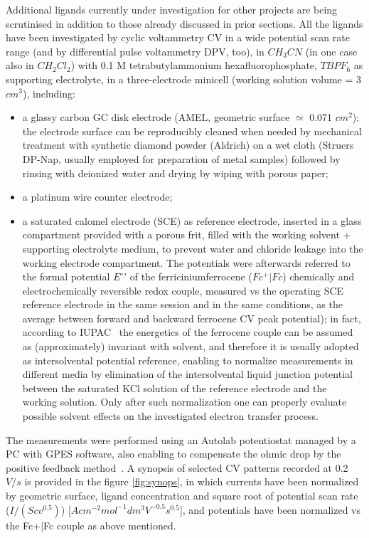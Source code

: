 \documentclass[../Master.tex]{subfiles}
\begin{document}
Additional ligands currently under investigation for other projects are being scrutinised in addition to those already discussed in prior sections.
All the ligands have been investigated by cyclic voltammetry CV in a wide potential scan rate range (and by differential pulse voltammetry DPV, too), in \(CH_{3}CN\) (in one case also in \(CH_{2}Cl_{2}\)) with 0.1 M tetrabutylammonium hexafluorophosphate, \(TBPF_{6}\) as supporting electrolyte, in a three-electrode minicell (working solution volume = 3 \(cm^{3}\)), including:

\begin{itemize}
	\item a glassy carbon GC disk electrode (AMEL, geometric surface \(\simeq\) 0.071 \(cm^{2}\)); the electrode surface can be reproducibly cleaned when needed by mechanical treatment with synthetic diamond powder (Aldrich) on a wet cloth (Struers DP-Nap, usually employed for preparation of metal samples) followed by rinsing with deionized water and drying by wiping with porous paper;
	\item a platinum wire counter electrode;
	\item a saturated calomel electrode (SCE) as reference electrode, inserted in a glass compartment provided with a porous frit, filled with the working solvent + supporting electrolyte medium, to prevent water and chloride leakage into the working electrode compartment. The potentials were afterwards referred to the formal potential \(E ^{\circ}’\) of the ferricinium\vert ferrocene (\(Fc^{+}|Fc\)) chemically and electrochemically reversible redox couple, measured  vs the operating SCE reference electrode in the same session and in the same conditions, as the average between forward and backward ferrocene CV peak potential); in fact, according to IUPAC\ \cite{gritzner_recommendations_1982} the energetics of the ferrocene couple can be assumed as (approximately) invariant with solvent, and therefore it is usually adopted as intersolvental potential reference, enabling to normalize measurements in different media by elimination of the intersolvental liquid junction potential between the saturated KCl solution of the reference electrode and the working solution. Only after such normalization one can properly evaluate possible solvent effects on the investigated electron transfer process.
\end{itemize}

The measurements were performed using an Autolab potentiostat managed by a PC with GPES software, also enabling to compensate the ohmic drop by the positive feedback method\ \cite{bard_electrochemical_2001}.
A synopsis of selected CV patterns recorded at 0.2 \(V/s\) is provided in the figure \ref{fig:synops}, in which currents have been normalized by geometric surface, ligand concentration and square root of potential scan rate (\(I/(Scv^{0.5})\)) [\(A cm^{-2} mol^{-1} dm^{3} V^{-0.5} s^{0.5}\)], and potentials have been normalized vs the Fc+|Fc couple as above mentioned.
\end{document}
